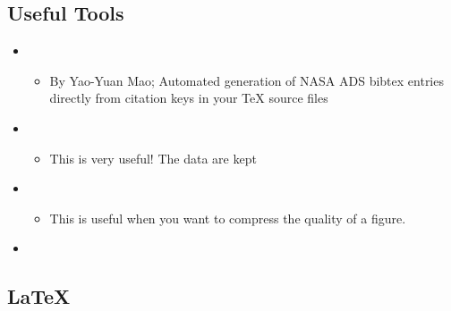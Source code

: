 \documentclass[letterpaper,10pt,english]{sphinxmanual}
\begin{document}
\subsection{Useful Tools}
\label{\detokenize{resource/research/writing_paper:useful-tools}}\begin{itemize}
\item {} 
\begin{itemize}
\item {} 
By Yao-Yuan Mao; Automated generation of NASA ADS bibtex entries
directly from citation keys in your TeX source files

\end{itemize}

\item {} 
\begin{itemize}
\item {} 
This is very useful! The data are kept

\end{itemize}

\item {} 
\begin{itemize}
\item {} 
This is useful when you want to compress the quality of a figure.

\end{itemize}

\item {} 

\end{itemize}


\subsection{LaTeX}
\label{\detokenize{resource/research/writing_paper:latex}}
\end{document}
